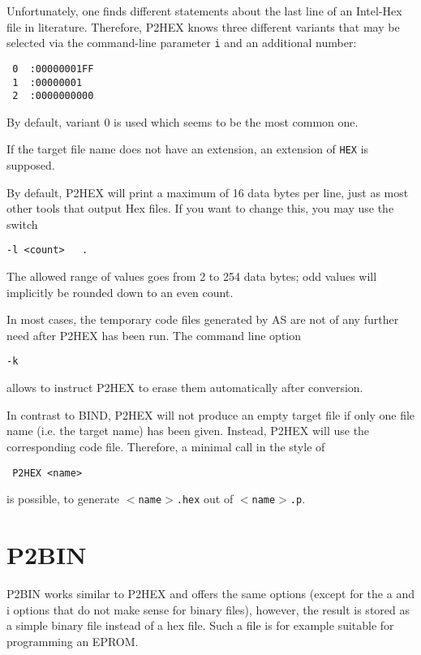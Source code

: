 \documentclass[12pt,twoside]{report}
\newcommand{\tty}[1]{{\tt #1}}
\begin{document}
Unfortunately, one finds different statements about the last line of
an Intel-Hex file in literature.  Therefore, P2HEX knows three
different variants that may be selected via the command-line
parameter \tty{i} and an additional number:
\begin{verbatim}
 0  :00000001FF
 1  :00000001
 2  :0000000000
\end{verbatim}
By default, variant 0 is used which seems to be the most common one.

If the target file name does not have an extension, an extension of
\tty{HEX} is supposed.

By default, P2HEX will print a maximum of 16 data bytes per line,
just as most other tools that output Hex files.  If you want to
change this, you may use the switch
\begin{verbatim}
-l <count>   .
\end{verbatim}
The allowed range of values goes from 2 to 254 data bytes; odd values
will implicitly be rounded down to an even count.

In most cases, the temporary code files generated by AS are not of
any further need after P2HEX has been run.  The command line option
\begin{verbatim}
-k
\end{verbatim}
allows to instruct P2HEX to erase them automatically after
conversion.

In contrast to BIND, P2HEX will not produce an empty target file if
only one file name (i.e. the target name) has been given.  Instead,
P2HEX will use the corresponding code file.  Therefore, a minimal
call in the style of
\begin{verbatim}
 P2HEX <name>
\end{verbatim}
is possible, to generate \tty{$<$name$>$.hex} out of \tty{$<$name$>$.p}.


\section{P2BIN}

P2BIN works similar to P2HEX and offers the same options (except for
the a and i options that do not make sense for binary files),
however, the result is stored as a simple binary file instead of a
hex file.  Such a file is for example suitable for programming an
EPROM.
\end{document}
